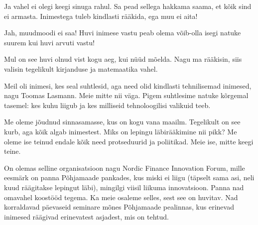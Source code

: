 Ja vahel ei olegi keegi sinuga rahul. Sa pead sellega 
hakkama saama, et kõik sind ei armasta. Inimestega tuleb kindlasti rääkida, ega muu ei aita!


Jah, muudmoodi ei saa! Huvi inimese vastu peab olema 
võib-olla isegi natuke suurem kui huvi arvuti vastu! 


Mul on see huvi olnud vist kogu aeg, kui nüüd mõelda. Nagu ma rääkisin, siis valisin tegelikult kirjanduse ja 
matemaatika vahel. 


Meil oli inimesi, kes seal suhtlesid, aga need olid kindlasti tehnilisemad inimesed,
nagu Toomas Lasmann. Meie mitte nii väga. Pigem suhtlesime natuke 
kõrgemal tasemel: kes kuhu liigub ja kes milliseid tehnoloogilisi valikuid teeb.


Me oleme jõudnud sinnasamasse, kus on kogu vana maailm. Tegelikult on 
see kurb, aga kõik algab inimestest. Miks on lepingu 
läbirääkimine nii pikk? Me oleme ise teinud endale kõik need protseduurid ja 
poliitikad. Meie ise, mitte keegi teine. 

On olemas selline organisatsioon nagu Nordic Finance Innovation Forum, mille eesmärk 
on panna Põhjamaade pankades, kus miski ei liigu (täpselt sama asi, neli 
kuud räägitakse lepingut läbi), mingilgi viisil liikuma innovatsioon. Panna nad 
omavahel koostööd tegema. Ka meie osaleme selles, sest see on huvitav. Nad korraldavad 
päevaseid seminare mõnes Põhjamaade pealinnas, kus 
erinevad inimesed räägivad erinevatest asjadest, mis on tehtud. 

